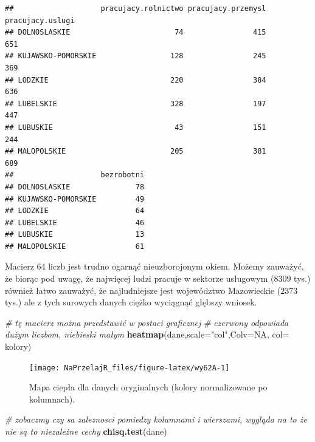 \documentclass[polish,]{book}
\newenvironment{Shaded}{\begin{snugshade}}{\end{snugshade}}
\newcommand{\CommentTok}[1]{\textcolor[rgb]{0.56,0.35,0.01}{\textit{#1}}}
\newcommand{\DataTypeTok}[1]{\textcolor[rgb]{0.13,0.29,0.53}{#1}}
\newcommand{\KeywordTok}[1]{\textcolor[rgb]{0.13,0.29,0.53}{\textbf{#1}}}
\newcommand{\NormalTok}[1]{#1}
\newcommand{\OtherTok}[1]{\textcolor[rgb]{0.56,0.35,0.01}{#1}}
\newcommand{\StringTok}[1]{\textcolor[rgb]{0.31,0.60,0.02}{#1}}
\begin{document}
\begin{verbatim}
##                    pracujacy.rolnictwo pracujacy.przemysl pracujacy.uslugi
## DOLNOSLASKIE                        74                415              651
## KUJAWSKO-POMORSKIE                 128                245              369
## LODZKIE                            220                384              636
## LUBELSKIE                          328                197              447
## LUBUSKIE                            43                151              244
## MALOPOLSKIE                        205                381              689
##                    bezrobotni
## DOLNOSLASKIE               78
## KUJAWSKO-POMORSKIE         49
## LODZKIE                    64
## LUBELSKIE                  46
## LUBUSKIE                   13
## MALOPOLSKIE                61
\end{verbatim}

Macierz 64 liczb jest trudno ogarnąć nieuzborojonym okiem. Możemy zauważyć,
że biorąc pod uwagę, że najwięcej ludzi pracuje w sektorze usługowym (\(8309\) tys.)
również łatwo zauważyć, że najludniejsze jest województwo Mazowieckie (\(2 373\) tys.) ale z tych surowych danych ciężko wyciągnąć głębszy wniosek.

\begin{Shaded}
\begin{Highlighting}[]
\CommentTok{# tę macierz można przedstawić w postaci graficznej}
\CommentTok{# czerwony odpowiada dużym liczbom, niebieski małym}
\KeywordTok{heatmap}\NormalTok{(dane,}\DataTypeTok{scale=}\StringTok{"col"}\NormalTok{,}\DataTypeTok{Colv=}\OtherTok{NA}\NormalTok{, }\DataTypeTok{col=}\NormalTok{ kolory)}
\end{Highlighting}
\end{Shaded}

\begin{figure}[h]

{\centering \texttt{[image: NaPrzelajR\_files/figure-latex/wy62A-1]} 

}

\caption{Mapa ciepła dla danych oryginalnych (kolory normalizowane po kolumnach).}\label{fig:wy62A}
\end{figure}

\begin{Shaded}
\begin{Highlighting}[]
\CommentTok{# zobaczmy czy sa zaleznosci pomiedzy kolumnami i wierszami, wygląda na to że nie są to niezależne cechy}
\KeywordTok{chisq.test}\NormalTok{(dane)}
\end{Highlighting}
\end{Shaded}
\end{document}
